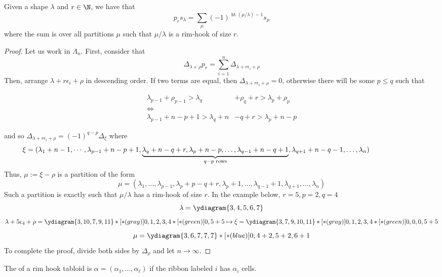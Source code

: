 \documentclass[11pt,leqno,oneside]{amsart}
\numberwithin{thm}{section}
\newcommand{\Vdet}{\Delta}
\newcommand{\rowshift}{\rho}
\newcommand{\sym}{\Lambda}
\newcommand{\height}{\operatorname{ht}}
\begin{document}
\begin{thm}
  Given a shape \(\lambda\) and \(r \in \N\), we have that \[
    p_r s_\lambda = \sum_{\mu} (-1)^{\height(\mu/\lambda)-1} s_{\mu}
  \]
  where the sum is over all partitions \(\mu\) such that
  \(\mu/\lambda\) is a rim-hook of size \(r\). 
\end{thm}
\begin{proof}
  Let us work in \(\sym_n\). First, consider that \[
    \Vdet_{\lambda+\rowshift} p_r = \sum_{i=1}^n \Vdet_{\lambda+r
      \epsilon_i+\rowshift}
  \]
  Then, arrange \(\lambda+ r \epsilon_i + \rowshift\) in descending
  order. If two terms are equal, then \(\Vdet_{\lambda+r \epsilon_i +
    \rowshift} = 0\), otherwise there will be some \(p \leq q\) such
  that
  \begin{samepage}
    \begin{align*}
      \lambda_{p-1} + \rowshift_{p-1} > \lambda_q &+\rowshift_{q}+r >
                                                    \lambda_p + \rowshift_p\\
      \iff&\\
      \lambda_{p-1} + n - p + 1 > \lambda_q + n &-q +r > \lambda_p + n - p
    \end{align*}
  \end{samepage}
  and so \(\Vdet_{\lambda+r \epsilon_i+\rowshift} = (-1)^{q-p}
  \Vdet_{\xi}\) where \[
    \hspace{-1in}   \xi = (\lambda_1+n-1, \cdots, \lambda_{p-1}+n-p+1,
    \underbrace{\lambda_q+n-q+r,\lambda_p+n-p, \ldots,
    \lambda_{q-1}+n-q+1}_{q-p\text{ rows}},\lambda_{q+1}+n-q-1,\ldots, \lambda_n)
  \]
  Thus, \(\mu := \xi-\rowshift\) is a partition of the form \[
  \mu = (\lambda_1, \ldots, \lambda_{p-1},\lambda_p + p - q +r,
    \lambda_p + 1, \ldots, \lambda_{q-1}+1, \lambda_{q+1}, \ldots,
    \lambda_n) 
  \]
  Such a partition is exactly such that \(\mu/\lambda\) has a rim-hook
  of size \(r\). In the example below, \(r = 5, p=2, q=4\) \[
    \lambda = \ydiagram{3,4,5,6,7}
  \]\[
    \lambda+5 \epsilon_4+\rowshift = \ydiagram{3,10,7,9,11}*[*(gray)]{0,1,2,3,4}*[*(green)]{0,5+5}
    \mapsto \xi = \ydiagram{3,7,9,10,11}*[*(gray)]{0,1,2,3,4}*[*(green)]{0,0,0,5+5}
  \]\[
    \mu = \ydiagram{3,6,7,7,7}*[*(blue)]{0,4+2,5+2,6+1}
  \]
  To complete the proof, divide both sides by \(\Vdet_\rowshift\) and
  let \(n \to \infty\).
\end{proof}
\begin{defn}
  The  of a rim hook tabloid is \(\alpha = (\alpha_1,
  \ldots, \alpha_\ell)\) if the ribbon labeled \(i\) has \(\alpha_i\)
  cells. 
\end{defn}
\end{document}
